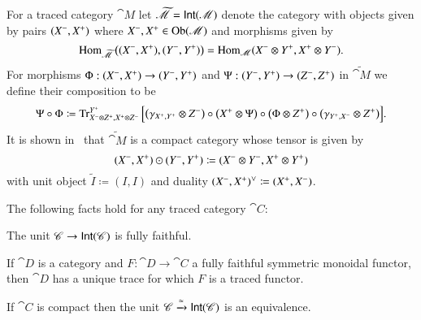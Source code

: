 \documentclass[12pt,oneside,article,draft]{memoir}
\begin{document}
For a traced category $\cat{M}$ let $\widetilde{\mathscr{M}}=\mathsf{Int}(\mathscr{M})$ denote the category with objects given by pairs $(X^-,X^+)$ where $X^-,X^+\in \operatorname{Ob}(\mathscr{M})$ and morphisms given by 
\[\operatorname{Hom}_{\widetilde{\mathscr{M}}}\big((X^-,X^+),(Y^-,Y^+)\big)=\operatorname{Hom}_{\mathscr{M}}(X^-\otimes Y^+,X^+\otimes Y^-).\]
For morphisms $\Phi:(X^-,X^+)\to(Y^-,Y^+)$ and $\Psi:(Y^-,Y^+)\to(Z^-,Z^+)$ in $\widetilde{\cat{M}}$ we define their composition to be
\[\Psi\circ\Phi\coloneqq\operatorname{Tr}^{Y^+}_{X^-\otimes Z^+,X^+\otimes Z^-}\Big[\big(\gamma_{X^+,Y^+}\otimes Z^-\big)\circ\big(X^+\otimes\Psi\big)\circ\big(\Phi\otimes Z^+\big)\circ\big(\gamma_{Y^+,X^-}\otimes Z^+\big)\Big].\]
It is shown in~\cite{JoyalStreetVerity} that $\widetilde{\cat{M}}$ is a compact  category whose tensor is given by
\[(X^-,X^+)\odot(Y^-,Y^+)\coloneqq(X^-\otimes Y^-,X^+\otimes Y^+)\]
with unit object $\tilde I\coloneqq(I,I)$ and duality $(X^-,X^+)^\vee\coloneqq(X^+,X^-)$.  


%
%
%

\begin{lemma}\label{lemma:fully faithful and trace}
The following facts hold for any traced category $\cat{C}$:
\begin{compactitem}
	\item The unit $\mathscr{C}\to\mathsf{Int}(\mathscr{C})$ is fully faithful.
	\item If $\cat{D}$ is a category and $F\colon\cat{D}\to\cat{C}$ a fully faithful symmetric monoidal functor, then $\cat{D}$ has a unique trace for which $F$ is a traced functor.
	\item If $\cat{C}$ is compact then the unit $\mathscr{C}\xrightarrow{\simeq}\mathsf{Int}(\mathscr{C})$ is an equivalence.
\end{compactitem}
\end{lemma}
\end{document}
